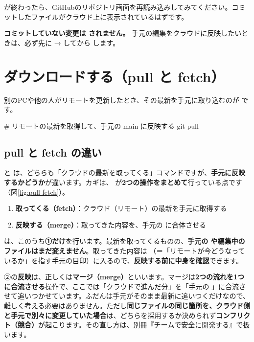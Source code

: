  が終わったら、GitHubのリポジトリ画面を再読み込みしてみてください。コミットしたファイルがクラウド上に表示されているはずです。

\begin{warnbox}
\textbf{コミットしていない変更は  されません。} 手元の編集をクラウドに反映したいときは、必ず先に  →  してから  します。
\end{warnbox}

\section{ダウンロードする（pull と fetch）}

別のPCや他の人がリモートを更新したとき、その最新を手元に取り込むのが  です。

\begin{codebox}[bash]
\begin{code}
# リモートの最新を取得して、手元の main に反映する
git pull
\end{code}
\end{codebox}

\subsection{pull と fetch の違い}

 と  は、どちらも「クラウドの最新を取ってくる」コマンドですが、\textbf{手元に反映するかどうか}が違います。カギは、 が\textbf{2つの操作をまとめて}行っている点です（図\ref{fig:pull-fetch}）。

\begin{enumerate}[leftmargin=1.6em]
  \item \textbf{取ってくる（fetch）}：クラウド（リモート）の最新を手元に取得する
  \item \textbf{反映する（merge）}：取ってきた内容を、手元の  に合体させる
\end{enumerate}

 は、このうち\textbf{①だけ}を行います。最新を取ってくるものの、\textbf{手元の  や編集中のファイルはまだ変えません}。取ってきた内容は （＝「リモートが今どうなっているか」を指す手元の目印）に入るので、\textbf{反映する前に中身を確認}できます。

②の\textbf{反映}は、正しくは\textbf{マージ（merge）}といいます。マージは\textbf{2つの流れを1つに合流させる}操作で、ここでは「クラウドで進んだ分」を「手元の 」に合流させて追いつかせています。ふだんは手元がそのまま最新に追いつくだけなので、難しく考える必要はありません。ただし\textbf{同じファイルの同じ箇所を、クラウド側と手元で別々に変更していた場合}は、どちらを採用するか決められず\textbf{コンフリクト（競合）}が起こります。その直し方は、別冊『チームで安全に開発する』で扱います。

